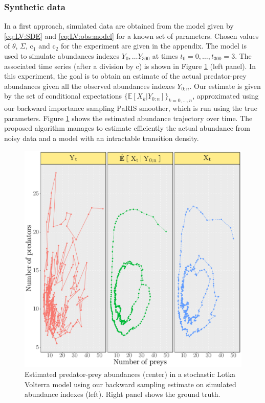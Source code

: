 \documentclass{article}
\def\pE{\mathbb{E}}
\begin{document}
\subsubsection*{Synthetic data}

In a first approach,  simulated data are obtained from the model given by \eqref{eq:LV:SDE} and \eqref{eq:LV:obs:model} for a known set of parameters. Chosen values of $\theta$, $\Sigma$, $\text{c}_1$ and $\text{c}_2$ for the experiment are given in the appendix. 
The model is used to simulate abundances indexes $Y_0,\dots Y_{300}$ at times $t_0 = 0,\dots, t_{300} = 3$. 
The associated time series (after a division by $\text{c}$) is shown in Figure \ref{fig:LV:tracking} (left panel). In this experiment, the goal is to obtain an estimate of the actual predator-prey abundances given all the observed abundances indexes $Y_{0:n}$. 
Our estimate is given by the set of conditional expectations $\lbrace\pE[ X_k \vert Y_{0:n}]\rbrace_{k = 0,\dots, n}$, approximated using our backward importance sampling PaRIS smoother, which is run using the true parameters. 
Figure \ref{fig:LV:tracking} shows the estimated abundance trajectory over time. 
The proposed algorithm manages to estimate efficiently the actual abundance from noisy data and a model with an intractable transition density.

\begin{figure}
\begin{center}
\includegraphics[scale = .4]{smoothed_tracking_LV.pdf}
\end{center}
\caption{\label{fig:LV:tracking} Estimated predator-prey abundances (center) in a stochastic Lotka Volterra model using our backward sampling estimate on simulated abundance indexes (left). Right panel shows the ground truth.}
\end{figure}
\end{document}
